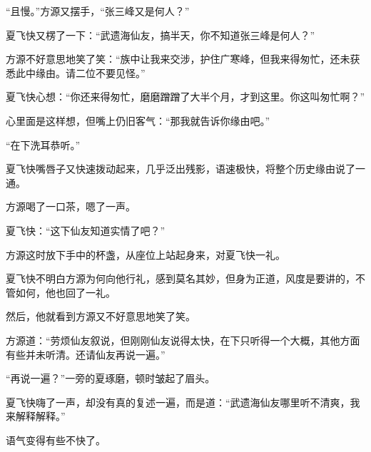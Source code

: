 \begin{this_body}
“且慢。”方源又摆手，“张三峰又是何人？”

夏飞快又楞了一下：“武遗海仙友，搞半天，你不知道张三峰是何人？”

方源不好意思地笑了笑：“族中让我来交涉，护住广寒峰，但我来得匆忙，还未获悉此中缘由。请二位不要见怪。”

夏飞快心想：“你还来得匆忙，磨磨蹭蹭了大半个月，才到这里。你这叫匆忙啊？”

心里面是这样想，但嘴上仍旧客气：“那我就告诉你缘由吧。”

“在下洗耳恭听。”

夏飞快嘴唇子又快速拨动起来，几乎泛出残影，语速极快，将整个历史缘由说了一通。

方源喝了一口茶，嗯了一声。

夏飞快：“这下仙友知道实情了吧？”

方源这时放下手中的杯盏，从座位上站起身来，对夏飞快一礼。

夏飞快不明白方源为何向他行礼，感到莫名其妙，但身为正道，风度是要讲的，不管如何，他也回了一礼。

然后，他就看到方源又不好意思地笑了笑。

方源道：“劳烦仙友叙说，但刚刚仙友说得太快，在下只听得一个大概，其他方面有些并未听清。还请仙友再说一遍。”

“再说一遍？”一旁的夏琢磨，顿时皱起了眉头。

夏飞快嗨了一声，却没有真的复述一遍，而是道：“武遗海仙友哪里听不清爽，我来解释解释。”

语气变得有些不快了。

\end{this_body}

